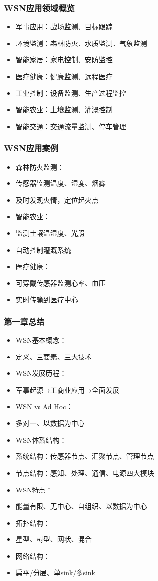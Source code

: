 \documentclass[aspectratio=43]{beamer}
\begin{document}
\begin{frame}
  \frametitle{WSN应用领域概览}

  \begin{itemize}
  \item<+-> 军事应用：战场监测、目标跟踪
  \item<+-> 环境监测：森林防火、水质监测、气象监测
  \item<+-> 智能家居：家电控制、安防监控
  \item<+-> 医疗健康：健康监测、远程医疗
  \item<+-> 工业控制：设备监测、生产过程监控
  \item<+-> 智能农业：土壤监测、灌溉控制
  \item<+-> 智能交通：交通流量监测、停车管理
  \end{itemize}
\end{frame}

\begin{frame}
  \frametitle{WSN应用案例}

  \begin{itemize}
  \item<+-> 森林防火监测：
  \item<+-> 传感器监测温度、湿度、烟雾
  \item<+-> 及时发现火情，定位起火点
  \item<+-> 智能农业：
  \item<+-> 监测土壤温湿度、光照
  \item<+-> 自动控制灌溉系统
  \item<+-> 医疗健康：
  \item<+-> 可穿戴传感器监测心率、血压
  \item<+-> 实时传输到医疗中心
  \end{itemize}
\end{frame}

\begin{frame}
  \frametitle{第一章总结}

  \begin{itemize}
  \item<+-> WSN基本概念：
  \item<+-> 定义、三要素、三大技术
  \item<+-> WSN发展历程：
  \item<+-> 军事起源→工商业应用→全面发展
  \item<+-> WSN vs Ad Hoc：
  \item<+-> 多对一、以数据为中心
  \item<+-> WSN体系结构：
  \item<+-> 系统结构：传感器节点、汇聚节点、管理节点
  \item<+-> 节点结构：感知、处理、通信、电源四大模块
  \item<+-> WSN特点：
  \item<+-> 能量有限、无中心、自组织、以数据为中心
  \item<+-> 拓扑结构：
  \item<+-> 星型、树型、网状、混合
  \item<+-> 网络结构：
  \item<+-> 扁平/分层、单sink/多sink
  \end{itemize}
\end{frame}
\end{document}
